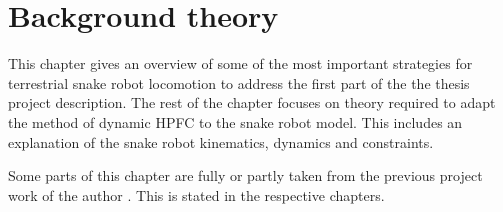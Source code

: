 \chapter{Background theory}\label{chapter:theory}

This chapter gives an overview of some of the most important strategies for terrestrial snake robot locomotion to address the first part of the the thesis project description. The rest of the chapter focuses on theory required to adapt the method of dynamic HPFC to the snake robot model. This includes an explanation of the snake robot kinematics, dynamics and constraints.


Some parts of this chapter are fully or partly taken from the previous project work of the author \cite{AtussaProsjektoppgp}. This is stated in the respective chapters.








%







